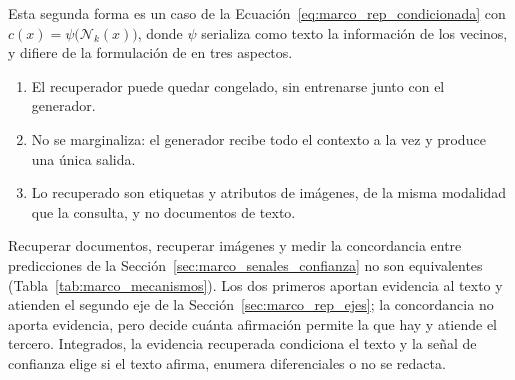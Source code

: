 Esta segunda forma es un caso de la Ecuación~\ref{eq:marco_rep_condicionada} con
$c(x) = \psi\bigl(\mathcal{N}_k(x)\bigr)$, donde $\psi$ serializa como texto la información de los vecinos, y
difiere de la formulación de \textcite{lewis2020retrievalaugmented} en tres aspectos.
\begin{enumerate}
    \item El recuperador puede quedar congelado, sin entrenarse junto con el generador.
    \item No se marginaliza: el generador recibe todo el contexto a la vez y produce una única salida.
    \item Lo recuperado son etiquetas y atributos de imágenes, de la misma modalidad que la consulta, y no
    documentos de texto.
\end{enumerate}

\label{sec:marco_integracion}%
Recuperar documentos, recuperar imágenes y medir la concordancia entre predicciones de la
Sección~\ref{sec:marco_senales_confianza} no son equivalentes (Tabla~\ref{tab:marco_mecanismos}). Los dos
primeros aportan evidencia al texto y atienden el segundo eje de la Sección~\ref{sec:marco_rep_ejes}; la
concordancia no aporta evidencia, pero decide cuánta afirmación permite la que hay y atiende el tercero.
Integrados, la evidencia recuperada condiciona el texto y la señal de confianza elige si el texto afirma,
enumera diferenciales o no se redacta.

